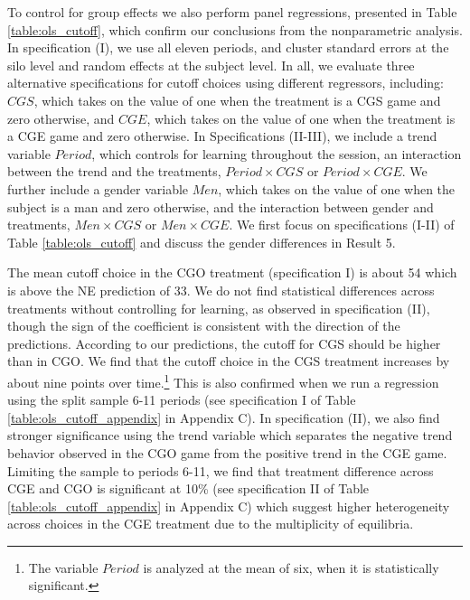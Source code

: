 \documentclass[12pt, letterpaper]{article}
\theoremstyle{plain}
\begin{document}
To control for group effects we also perform panel regressions, presented in Table \ref{table:ols_cutoff}, which confirm our conclusions from the nonparametric analysis. In specification (I), we use all eleven periods, and cluster standard errors at the silo level and random effects at the subject level. In all, we evaluate three alternative specifications for cutoff choices using different regressors, including: $CGS$, which takes on the value of one when the treatment is a CGS game and zero otherwise, and $CGE$, which takes on the value of one when the treatment is a CGE game and zero otherwise. In Specifications (II-III), we include a trend variable $Period$, which controls for learning throughout the session, an interaction between the trend and the treatments, $Period \times CGS$ or $Period \times CGE$. We further include a gender variable $Men$, which takes on the value of one when the subject is a man and zero otherwise, and the interaction between gender and treatments, $Men \times CGS$ or $Men \times CGE$. We first focus on specifications (I-II) of Table \ref{table:ols_cutoff} and discuss the gender differences in Result 5. 

The mean cutoff choice in the CGO treatment (specification I) is about 54 which is above the NE prediction of 33. We do not find statistical differences across treatments without controlling for learning, as observed in specification (II), though the sign of the coefficient is consistent with the direction of the predictions. According to our predictions, the cutoff for CGS should be higher than in CGO. We find that the cutoff choice in the CGS treatment increases by about nine points over time.\footnote{The variable $Period$ is analyzed at the mean of six, when it is statistically significant.} This is also confirmed when we run a regression using the split sample 6-11 periods (see specification I of Table \ref{table:ols_cutoff_appendix} in Appendix C). In specification (II), we also find stronger significance using the trend variable which separates the negative trend behavior observed in the CGO game from the positive trend in the CGE game. Limiting the sample to periods 6-11, we find that treatment difference across CGE and CGO is significant at 10\% (see specification II of Table \ref{table:ols_cutoff_appendix} in Appendix C) which suggest higher heterogeneity across choices in the CGE treatment due to the multiplicity of equilibria. 
\end{document}
